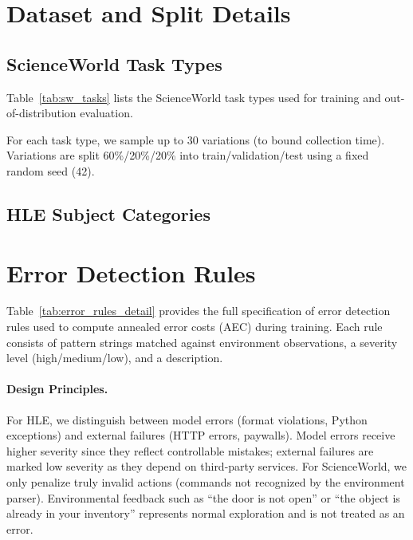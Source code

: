 
\section{Dataset and Split Details}
\label{app:data}

\subsection{ScienceWorld Task Types}

Table~\ref{tab:sw_tasks} lists the ScienceWorld task types used for training and out-of-distribution evaluation.



For each task type, we sample up to 30 variations (to bound collection time). Variations are split 60\%/20\%/20\% into train/validation/test using a fixed random seed (42).

\subsection{HLE Subject Categories}



\section{Error Detection Rules}
\label{app:error_rules}

Table~\ref{tab:error_rules_detail} provides the full specification of error detection rules used to compute annealed error costs (AEC) during training.
Each rule consists of pattern strings matched against environment observations, a severity level (high/medium/low), and a description.

\paragraph{Design Principles.}
For HLE, we distinguish between model errors (format violations, Python exceptions) and external failures (HTTP errors, paywalls).
Model errors receive higher severity since they reflect controllable mistakes; external failures are marked low severity as they depend on third-party services.
For ScienceWorld, we only penalize truly invalid actions (commands not recognized by the environment parser).
Environmental feedback such as ``the door is not open'' or ``the object is already in your inventory'' represents normal exploration and is not treated as an error.

